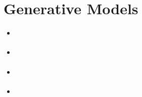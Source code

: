 \section{Generative Models}

{\color{orange}
\begin{itemize}
    \item \citep{peeblesLearningLearnGenerative2022}
    \item \citep{erkocHyperDiffusionGeneratingImplicit2023}
    \item \citep{schurholtHyperRepresentationsLearningPopulations2024a}
    \item \citep{kruegerBayesianHypernetworks2018}
\end{itemize}
}


